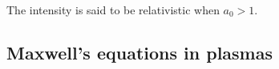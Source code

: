\noindent The intensity is said to be relativistic when $a_0 > 1$.
%
%
%
%
%
%
%
%
%
%


\subsection{Maxwell's equations in plasmas}

